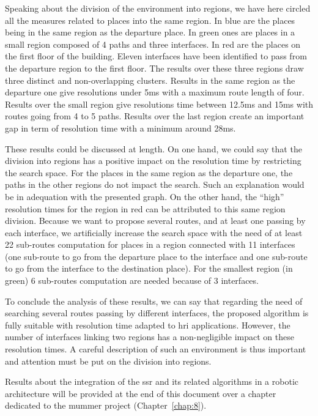 Speaking about the division of the environment into regions, we have here circled all the measures related to places into the same region. In blue are the places being in the same region as the departure place. In green ones are places in a small region composed of 4 paths and three interfaces. In red are the places on the first floor of the building. Eleven interfaces have been identified to pass from the departure region to the first floor. The results over these three regions draw three distinct and non-overlapping clusters. Results in the same region as the departure one give resolutions under 5ms with a maximum route length of four. Results over the small region give resolutions time between 12.5ms and 15ms with routes going from 4 to 5 paths. Results over the last region create an important gap in term of resolution time with a minimum around 28ms. 

These results could be discussed at length. On one hand, we could say that the division into regions has a positive impact on the resolution time by restricting the search space. For the places in the same region as the departure one, the paths in the other regions do not impact the search. Such an explanation would be in adequation with the presented graph. On the other hand, the ``high'' resolution times for the region in red can be attributed to this same region division. Because we want to propose several routes, and at least one passing by each interface, we artificially increase the search space with the need of at least 22 sub-routes computation for places in a region connected with 11 interfaces (one sub-route to go from the departure place to the interface and one sub-route to go from the interface to the destination place). For the smallest region (in green) 6 sub-routes computation are needed because of 3 interfaces.

To conclude the analysis of these results, we can say that regarding the need of searching several routes passing by different interfaces, the proposed algorithm is fully suitable with resolution time adapted to \acrshort{hri} applications. However, the number of interfaces linking two regions has a non-negligible impact on these resolution times. A careful description of such an environment is thus important and attention must be put on the division into regions.  

Results about the integration of the \acrshort{ssr} and its related algorithms in a robotic architecture will be provided at the end of this document over a chapter dedicated to the \acrshort{mummer} project (Chapter~\ref{chap:8}).
